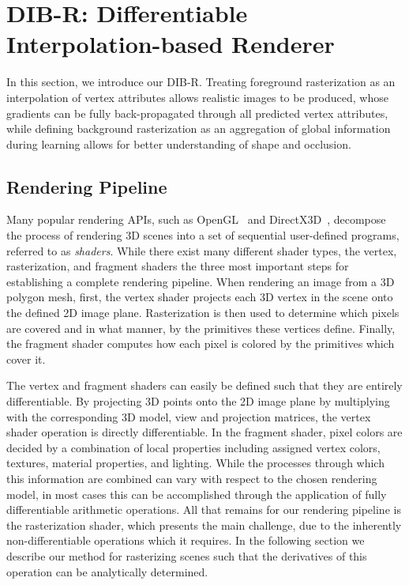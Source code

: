 \documentclass{article}
\newcommand{\model}{DIB-R}
\newcommand{\vertexdatas}{attributes}
\begin{document}
\vspace{-5pt}
\section{{\model }: Differentiable Interpolation-based  Renderer}
\vspace{-5pt}
In this section, we introduce our {\model }. Treating foreground rasterization as an interpolation of vertex attributes allows realistic images to be produced, whose gradients can be fully back-propagated through all predicted vertex \vertexdatas, while defining background rasterization as an aggregation of global information during learning allows for better understanding of shape and occlusion. 

\vspace{-7pt}
\subsection{Rendering Pipeline}
\vspace{-5pt}
Many popular rendering APIs, such as OpenGL~\cite{woo1999opengl} and DirectX3D~\cite{luna2012introduction}, decompose the process of rendering 3D scenes into a set of sequential user-defined programs, referred to as \emph{shaders}. While there exist many different shader types, the vertex, rasterization, and fragment shaders the three most important steps for establishing a complete rendering pipeline. When rendering an image from a 3D polygon mesh, first, the vertex shader projects each 3D vertex in the scene onto the defined 2D image plane. Rasterization is then used to determine which pixels are covered and in what manner, by the primitives these vertices define. Finally, the fragment shader computes how each pixel is colored by the primitives which cover it.  

The vertex and fragment shaders can easily be defined such that they are entirely differentiable. By projecting 3D points onto the 2D image plane by multiplying with the corresponding 3D model, view and projection matrices, the vertex shader operation is directly differentiable. In the fragment shader, pixel colors are decided by a combination of local properties including assigned vertex colors, textures, material properties, and lighting. While the processes through which this information are combined can vary with respect to the chosen rendering model, in most cases this can be accomplished through the application of fully differentiable arithmetic operations. All that remains for our rendering pipeline is the rasterization shader, which presents the main challenge, due to the inherently non-differentiable operations which it requires. In the following section we describe our method for rasterizing scenes such that the derivatives of this operation can be analytically determined. 
\end{document}
